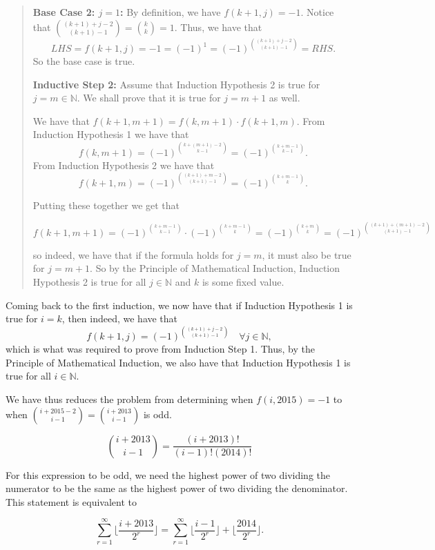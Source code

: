 \documentclass{article}
\begin{document}
\begin{enumerate}
\begin{quote}
\textbf{Base Case 2: $j = 1$:} By definition, we have $f(k + 1, j) = -1$. Notice that $\binom{(k + 1) + j - 2}{(k + 1) - 1} = \binom{k}{k} = 1$. Thus, we have that
$$LHS = f(k + 1, j) = -1 = (-1)^1 = (-1)^{\binom{(k + 1) + j - 2}{(k + 1) - 1}} = RHS.$$
So the base case is true.

\textbf{Inductive Step 2:} Assume that Induction Hypothesis 2 is true for $j = m \in \mathbb{N}$. We shall prove that it is true for $j = m + 1$ as well.

We have that $f(k + 1, m + 1) = f(k, m + 1) \cdot f(k + 1, m)$. From Induction Hypothesis 1 we have that 
$$f(k, m + 1) = (-1)^{\binom{k + (m + 1) - 2}{k - 1}} = (-1)^{\binom{k + m - 1}{k - 1}}.$$
From Induction Hypothesis 2 we have that
$$f(k + 1, m) = (-1)^{\binom{(k + 1) + m - 2}{(k + 1) - 1}} = (-1)^{\binom{k + m - 1}{k}}.$$

Putting these together we get that

$$f(k + 1, m + 1) = (-1)^{\binom{k + m - 1}{k - 1}} \cdot (-1)^{\binom{k + m - 1}{k}} = (-1)^{\binom{k + m}{k}} = (-1)^{\binom{(k + 1) + (m + 1) - 2}{(k + 1) - 1}}$$

so indeed, we have that if the formula holds for $j = m$, it must also be true for $j = m + 1$. So by the Principle of Mathematical Induction, Induction Hypothesis 2 is true for all $j \in \mathbb{N}$ and $k$ is some fixed value.
\end{quote}

Coming back to the first induction, we now have that if Induction Hypothesis 1 is true for $i = k$, then indeed, we have that
\[ f(k + 1, j) = (-1)^{\binom{(k + 1) + j - 2}{(k + 1) - 1}} \quad \forall j \in \mathbb{N}, \]
which is what was required to prove from Induction Step 1. Thus, by the Principle of Mathematical Induction, we also have that Induction Hypothesis 1 is true for all $i \in \mathbb{N}$.

We have thus reduces the problem from determining when $f(i, 2015) = -1$ to when $\binom{i + 2015 - 2}{i - 1} = \binom{i + 2013}{i - 1}$ is odd.

$$\binom{i + 2013}{i - 1} = \frac{(i + 2013)!}{(i - 1)!(2014)!}$$

For this expression to be odd, we need the highest power of two dividing the numerator to be the same as the highest power of two dividing the denominator. This statement is equivalent to

$$\sum_{r = 1}^{\infty} \lfloor{\frac{i + 2013}{2^r}}\rfloor = \sum_{r = 1}^{\infty}\lfloor \frac{i - 1}{2^r} \rfloor + \lfloor \frac{2014}{2^r} \rfloor.$$


\end{enumerate}
\end{document}

